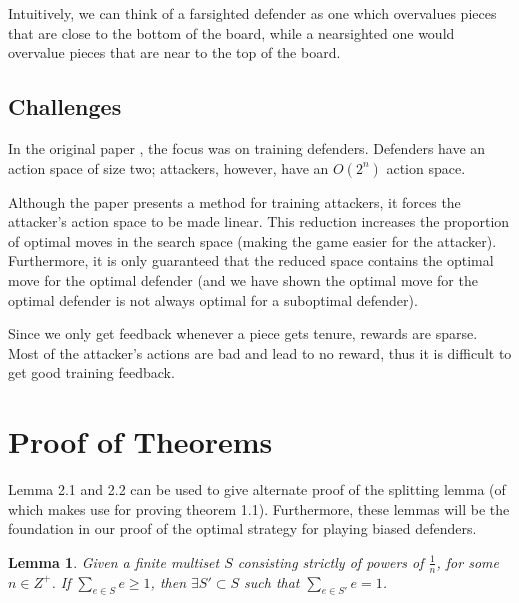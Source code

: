 \documentclass{article}
\theoremstyle{plain}
\newtheorem{lem}[thm]{Lemma}
\theoremstyle{definition}
\theoremstyle{remark}
\begin{document}
Intuitively, we can think of a farsighted defender as one which overvalues pieces that are close to the bottom of the board, while a nearsighted one would overvalue pieces that are near to the top of the board.

\subsection{Challenges}
In the original paper \cite{original}, the focus was on training defenders. Defenders have an action space of size two; attackers, however, have an $O(2^n)$ action space.

Although the paper presents a method for training attackers, it forces the attacker's action space to be made linear. This reduction increases the proportion of optimal moves in the search space (making the game easier for the attacker). Furthermore, it is only guaranteed that the reduced space contains the optimal move for the optimal defender (and we have shown the optimal move for the optimal defender is not always optimal for a suboptimal defender).

Since we only get feedback whenever a piece gets tenure, rewards are sparse. Most of the attacker's actions are bad and lead to no reward, thus it is difficult to get good training feedback.

%
% 
\newpage
\section{Proof of Theorems}

Lemma 2.1 and 2.2 can be used to give alternate proof of the splitting lemma (of which \cite{original} makes use for proving theorem 1.1). Furthermore, these lemmas will be the foundation in our proof of the optimal strategy for playing biased defenders.

\begin{lem}
	Given a finite multiset $S$ consisting strictly of powers of $\frac{1}{n}$, for some $n \in Z^+$. If $ \sum_{e \in S} e \ge 1$, then $\exists S' \subset S$ such that $ \sum_{e \in S'} e  = 1$.
\end{lem}
\end{document}
